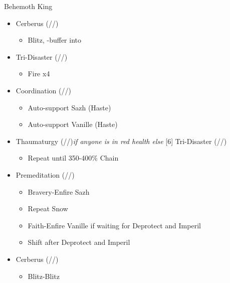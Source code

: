 \begin{multicols}{2}
\renewcommand{\first}{[1] Cerberus (\com/\com/\com)}
\renewcommand{\second}{[2] Cerberus (\com/\com/\com)}
\renewcommand{\third}{[3] Premeditation (\syn/\sen/\sab)}
\renewcommand{\fourth}{[4] Coordination (\syn/\rav/\med)}
\renewcommand{\fifth}{[5] Thaumaturgy (\rav/\rav/\med)}
\renewcommand{\sixth}{[6] Tri-Disaster (\rav/\rav/\rav)}

\begin{battle}[0:53]{Behemoth King}
  \begin{itemize}
    \item \second
          \begin{itemize}
            \item Blitz, \rav-buffer into
          \end{itemize}
    \item \sixth
          \begin{itemize}
            \item Fire x4
          \end{itemize}
    \item \fourth
          \begin{itemize}
            \item Auto-support Sazh (Haste)
            \item Auto-support Vanille (Haste)
          \end{itemize}
    \item \fifth \textit{if anyone is in red health else} \sixth
          \begin{itemize}
            \item Repeat until 350-400\% Chain
          \end{itemize}
    \item \third
          \begin{itemize}
            \item Bravery-Enfire Sazh
            \item Repeat Snow
            \item Faith-Enfire Vanille if waiting for Deprotect and Imperil
            \item Shift after Deprotect and Imperil
          \end{itemize}
    \item \second
          \begin{itemize}
            \item Blitz-Blitz
          \end{itemize}
  \end{itemize}
\end{battle}
\vfill


\end{multicols}
